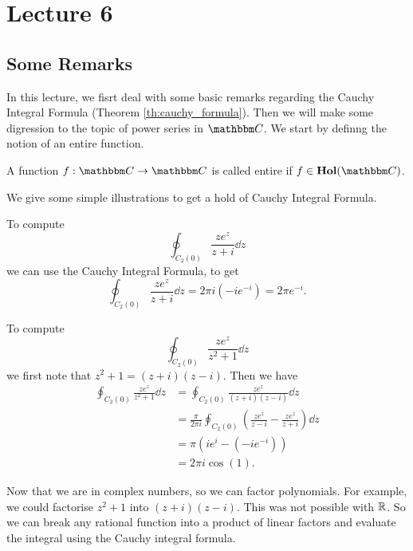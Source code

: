 \documentclass[../ComplexAnalysis_Notes.tex]{subfiles}
\begin{document}
\chapter*{Lecture 6} %

\setcounter{chapter}{6} %
\setcounter{section}{0}
\setcounter{equation}{0}
\setcounter{figure}{0}

\section{Some Remarks}

In this lecture, we fisrt deal with some basic remarks regarding the Cauchy Integral Formula (Theorem \ref{th:cauchy_formula}). Then we will make some digression to the topic of power series in \(\C\). We start by definng the notion of an entire function.

\begin{Def}{}{}
  A function \(f: \C \to \C\) is called entire if \(f \in \Hol(\C)\).
\end{Def}

We give some simple illustrations to get a hold of Cauchy Integral Formula.

\begin{Eg}{}{}
  To compute \[ \oint_{C_2(0)} \frac{ze^z}{z+i} \dd{z} \]
  we can use the Cauchy Integral Formula, to get
  \[
    \oint_{C_2(0)} \frac{ze^z}{z+i} \dd{z} = 2\pi i (-ie^{-i}) = 2\pi e^{-i}.
  \]
\end{Eg}

\begin{Eg}{}{}
  To compute \[ \oint_{C_2(0)} \frac{ze^z}{z^2 + 1} \dd{z} \]
  we first note that \(z^2 + 1 = (z+i)(z-i)\). Then we have
  \begin{align*}
    \oint_{C_2(0)} \frac{ze^z}{z^2 + 1} \dd{z}
     & = \oint_{C_2(0)} \frac{ze^z}{(z+i)(z-i)} \dd{z}                                               \\
     & = \frac{\pi}{2\pi i} \oint_{C_2(0)} \left( \frac{ze^z}{z-i} - \frac{ze^z}{z+i} \right) \dd{z} \\
     & = \pi \left( ie^i - (-ie^{-i}) \right)                                                        \\
     & = 2\pi i \cos(1).
  \end{align*}
\end{Eg}


Now that we are in complex numbers, so we can factor polynomials. For example, we could factorise \(z^2 + 1\) into \((z+i)(z-i)\). This was not possible with \(\mathbb{R}\). So we can break any rational function into a product of linear factors and evaluate the integral using the Cauchy integral formula.
\end{document}
